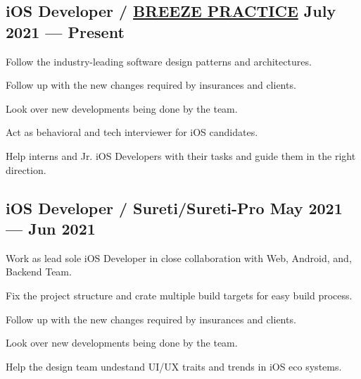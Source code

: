 \documentclass[letter,10pt]{article}
\begin{document}
\subsection{{iOS Developer / \href{https://www.carecloud.com/breeze/}{BREEZE PRACTICE} \hfill July 2021 --- Present}}
\begin{zitemize}
\item Follow the industry-leading software design patterns and architectures.
\item Follow up with the new changes required by insurances and clients.
\item Look over new developments being done by the team.
\item Act as behavioral and tech interviewer for iOS candidates.
\item Help interns and Jr. iOS Developers with their tasks and guide them in the right direction.
\end{zitemize}

\subsection{{iOS Developer / Sureti/Sureti-Pro \hfill May 2021 --- Jun 2021}}
\begin{zitemize}
\item Work as lead sole iOS Developer in close collaboration with Web, Android, and, Backend Team.
\item Fix the project structure and crate multiple build targets for easy build process.
\item Follow up with the new changes required by insurances and clients.
\item Look over new developments being done by the team.
\item Help the design team undestand UI/UX traits and trends in iOS eco systems.
\end{zitemize}

\end{document}
